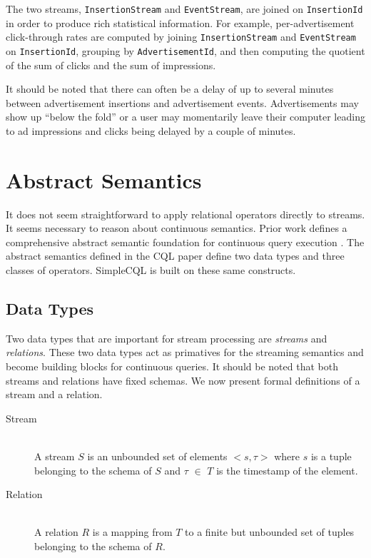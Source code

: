 \documentclass[a4paper, 10pt, conference]{IEEEconf}
\begin{document}
The two streams, \texttt{InsertionStream} and \texttt{EventStream}, are joined on \texttt{InsertionId} in order to produce rich statistical information.  For example, per-advertisement click-through rates are computed by joining \texttt{InsertionStream} and \texttt{EventStream} on \texttt{InsertionId}, grouping by \texttt{AdvertisementId}, and then computing the quotient of the sum of clicks and the sum of impressions.

It should be noted that there can often be a delay of up to several minutes between advertisement insertions and advertisement events.  Advertisements may show up ``below the fold'' or a user may momentarily leave their computer leading to ad impressions and clicks being delayed by a couple of minutes.

\section{Abstract Semantics}
It does not seem straightforward to apply relational operators directly to streams.  It seems necessary to reason about continuous semantics.  Prior work defines a comprehensive abstract semantic foundation for continuous query execution \cite{cql}.  The abstract semantics defined in the CQL paper define two data types and three classes of operators.  SimpleCQL is built on these same constructs.

\subsection{Data Types}
Two data types that are important for stream processing are \textit{streams} and \textit{relations}.  These two data types act as primatives for the streaming semantics and become building blocks for continuous queries.  It should be noted that both streams and relations have fixed schemas. We now present formal definitions of a stream and a relation.

\begin{description}
  \item[Stream] \hfill \\
  A stream $S$ is an unbounded set of elements $<s, \tau>$ where $s$ is a tuple belonging to the schema of $S$ and $\tau$ $\in$ $T$ is the timestamp of the element.
  
  \item[Relation] \hfill \\
  A relation $R$ is a mapping from $T$ to a finite but unbounded set of tuples belonging to the schema of $R$.
\end{description}
\end{document}
